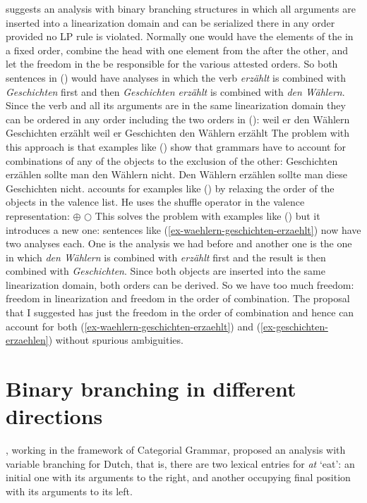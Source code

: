 \begin{exe}
\begin{xlist}
\citet{Kathol2000a} suggests an analysis with binary branching structures in which all arguments are
inserted into a linearization domain and can be serialized there in any order provided no LP rule is
violated. Normally one would have the elements of the \compsl in a fixed order, combine the head
with one element from the \compsl after the other, and let the freedom in the \doml be responsible
for the various attested orders. So both sentences in () would have analyses in which the
verb \emph{erzählt} is combined with \emph{Geschichten} first and then \emph{Geschichten erzählt} is
combined with \emph{den Wählern}. Since the verb and all its arguments are in the same linearization
domain they can be ordered in any order including the two orders in ():
\eal
\label{ex-waehlern-geschichten-erzaehlt}
\ex weil er den Wählern Geschichten erzählt
\ex weil er Geschichten den Wählern erzählt
\zl
The problem with this approach is that examples like () show that grammars have to account
for combinations of any of the objects to the exclusion of the other:
\eal
\label{ex-geschichten-erzaehlen}
\ex Geschichten erzählen sollte man den Wählern nicht.
\ex Den Wählern erzählen sollte man diese Geschichten nicht.
\zl
\citet{Kathol2000a} accounts for examples like () by relaxing the order of the objects in the
valence list. He uses the shuffle operator in the valence representation:
\ea
{} $\oplus$  $\bigcirc$ 
\z
This solves the problem with examples like () but it introduces a new one: sentences like
(\ref{ex-waehlern-geschichten-erzaehlt}) now have two analyses each. One is the analysis we had before and another one is the one
in which \emph{den Wählern} is combined with \emph{erzählt} first and the result is then combined
with \emph{Geschichten}. Since both objects are inserted into the same linearization domain, both
orders can be derived. So we have too much freedom: freedom in linearization and freedom in the
order of combination. The proposal that I suggested has just the freedom in the order of combination
and hence can account for both (\ref{ex-waehlern-geschichten-erzaehlt}) and
(\ref{ex-geschichten-erzaehlen}) without spurious ambiguities.

\section{Binary branching in different directions}


\mbox{}\citet[]{Steedman2000a-u}, working in the framework of Categorial Grammar, proposed
an analysis with variable branching for Dutch, that is, there are two lexical entries for
\emph{at} `eat': an initial one with its arguments to the right, and another occupying final
position with its arguments to its left. 


\end{xlist}
\end{exe}
